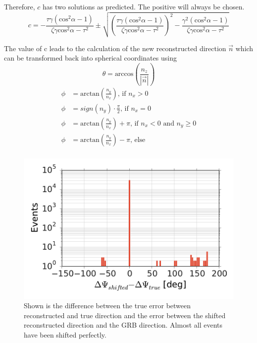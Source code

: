 Therefore, $c$ has two solutions as predicted. The positive will always be
chosen.
\begin{equation}
 c = -  \frac{\tau \gamma \left(\text{cos}^2\alpha - 1 \right)}{\zeta
\gamma \text{cos}^2\alpha - \tau^2} \pm \sqrt{\left( \frac{\tau \gamma
\left(\text{cos}^2\alpha - 1 \right)}{\zeta
\gamma \text{cos}^2\alpha - \tau^2} \right)^2 - \frac{\gamma^2 \left(
\text{cos}^2\alpha - 1 \right) }{\zeta
\gamma \text{cos}^2\alpha - \tau^2}}
\end{equation}

The value of c leads to the calculation of the new reconstructed direction
$\vec{n}$ which can be transformed back into spherical coordinates using
\begin{equation}
 \theta = \text{arccos} \left( \frac{n_z}{|\vec{n}|} \right)
\end{equation}
\begin{equation}
 \begin{align}
  \phi &= \text{arctan} \left( \frac{n_y}{n_x}\right)  \text{,  if  } n_x > 0\\
  \phi &= sign \left(n_y \right) \cdot \frac{\pi}{2}  \text{,  if  } n_x = 0\\
  \phi &= \text{arctan} \left( \frac{n_y}{n_x}\right) + \pi  \text{,  if  } n_x
<0 \text{ and } n_y \geq 0\\
  \phi &= \text{arctan} \left( \frac{n_y}{n_x}\right) - \pi  \text{,  else}\\
 \end{align}
\end{equation}


 


 
\begin{figure}[htbp]
  \centering
\includegraphics[width=
1.\textwidth]{fig/shift2source_true_minus_shifted_error.pdf}
  \caption{\label{fig:shift2source_proof}Shown is the difference between the
true error between reconstructed and true direction and the error between the
shifted reconstructed direction and the GRB direction. Almost all events have 
been shifted perfectly.}
\end{figure}


